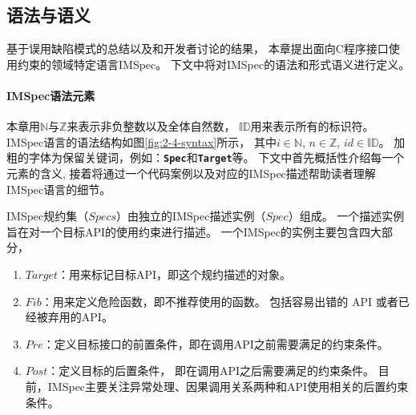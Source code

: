 \newcommand{\Nat}{\mathbb{N}}
\newcommand{\Int}{\mathbb{Z}}
\newcommand{\ID}{\mathbb{ID}}
\newcommand{\Cond}{\mathit{Cond}}
\newcommand{\true}{\texttt{true}}
\newcommand{\Pre}{\mathit{Pre}}
\newcommand{\Post}{\mathit{Post}}
\newcommand{\Fib}{\mathit{Fib}}
\newcommand{\Ret}{\mathit{Return}}
\newcommand{\ReturnFun}[1]{\texttt{\textbf{RETURN}(}#1\texttt{)}}
\newcommand{\Call}{\mathit{Call}}
\newcommand{\CallFun}[1]{\texttt{\textbf{Call}(}#1\texttt{)}}
\newcommand{\NULL}{\texttt{\textbf{NULL}}}
\newcommand{\FunName}{\mathit{FunName}}
\newcommand{\FunSig}{\mathit{FunSig}}
\newcommand{\Action}{\mathit{Action}}
\newcommand{\Arg}{\mathit{Arg}}
\newcommand{\Opd}{\mathit{Opd}}
\newcommand{\MemberOp}{\mathit{MemberOp}}
\newcommand{\CmpOp}{\mathit{CmpOp}}
\newcommand{\UnOp}{\mathit{UnOp}}
\newcommand{\Set}{\mathit{Set}}
\newcommand{\Type}{\mathit{Type}}
\newcommand{\IN}{\texttt{IN}}
\newcommand{\NOTIN}{\texttt{NOTIN}}
\newcommand{\LEN}{\texttt{LEN}}
\newcommand{\TYPE}{\texttt{TYPE}}
\newcommand{\MEMTYPE}{\texttt{MEMTYPE}}
\newcommand{\myid}{\mathit{id}}
\newcommand{\Target}{\mathit{Target}}
\newcommand{\Spec}{\mathit{Spec}}
\newcommand{\Specs}{\mathit{Specs}}

\subsection{语法与语义}
基于误用缺陷模式的总结以及和开发者讨论的结果，
本章提出面向C程序接口使用约束的领域特定语言IMSpec。
下文中将对IMSpec的语法和形式语义进行定义。

\paragraph{IMSpec语法元素}
本章用$\Nat$与$\Int$来表示非负整数以及全体自然数，
$\ID$用来表示所有的标识符。
IMSpec语言的语法结构如图\ref{fig:2-4-syntax}所示，
其中$i\in\Nat$, $n\in\Int$, $id \in \ID$。
加粗的字体为保留关键词，例如：\textbf{\texttt{Spec}}和\textbf{\texttt{Target}}等。
下文中首先概括性介绍每一个元素的含义,
接着将通过一个代码案例以及对应的IMSpec描述帮助读者理解IMSpec语言的细节。

IMSpec规约集（$\Specs$）由独立的IMSpec描述实例（$\Spec$）组成。
一个描述实例旨在对一个目标API的使用约束进行描述。
一个IMSpec的实例主要包含四大部分，
\begin{enumerate}
	\item $\Target$：用来标记目标API，即这个规约描述的对象。
	\item $\Fib$：用来定义危险函数，即不推荐使用的函数。
	包括容易出错的 API 或者已经被弃用的API。
	\item $\Pre$：定义目标接口的前置条件，即在调用API之前需要满足的约束条件。
	\item $\Post$：定义目标的后置条件，
	即在调用API之后需要满足的约束条件。
	目前，IMSpec主要关注异常处理、因果调用关系两种和API使用相关的后置约束条件。
\end{enumerate}

